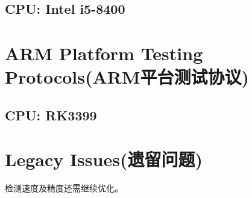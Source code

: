 \documentclass[a4paper, 11pt, UTF8]{ctexart}%
\begin{document}
\subsection{CPU: Intel i5-8400}

\section{ARM Platform Testing Protocols(ARM平台测试协议)}
\subsection{CPU: RK3399}

\section{Legacy Issues(遗留问题)}
检测速度及精度还需继续优化。
%
%
%
%
%
%
\end{document}
